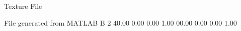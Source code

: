 Texture File

File generated from MATLAB
B 2
   40.00   0.00   0.00   1.00
   00.00   0.00   0.00   1.00

